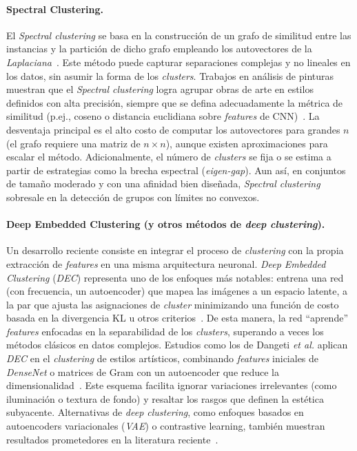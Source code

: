 \paragraph{Spectral Clustering.}
El \textit{Spectral clustering} se basa en la construcción de un grafo de similitud entre las instancias y la partición de dicho grafo empleando los autovectores de la \textit{Laplaciana}~\cite{guerin2018,gultepe2018}.
Este método puede capturar separaciones complejas y no lineales en los datos, sin asumir la forma de los \textit{clusters}.
Trabajos en análisis de pinturas muestran que el \textit{Spectral clustering} logra agrupar obras de arte en estilos definidos con alta precisión, siempre que se defina adecuadamente la métrica de similitud (p.ej., coseno o distancia euclidiana sobre \textit{features} de CNN)~\cite{gultepe2018}.
La desventaja principal es el alto costo de computar los autovectores para grandes $n$ (el grafo requiere una matriz de $n \times n$), aunque existen aproximaciones para escalar el método.
Adicionalmente, el número de \textit{clusters} se fija o se estima a partir de estrategias como la brecha espectral (\textit{eigen-gap}).
Aun así, en conjuntos de tamaño moderado y con una afinidad bien diseñada, \textit{Spectral clustering} sobresale en la detección de grupos con límites no convexos.

\paragraph{Deep Embedded Clustering (y otros métodos de \textit{deep clustering}).}
Un desarrollo reciente consiste en integrar el proceso de \textit{clustering} con la propia extracción de \textit{features} en una misma arquitectura neuronal.
\textit{Deep Embedded Clustering} (\textit{DEC}) representa uno de los enfoques más notables: entrena una red (con frecuencia, un autoencoder) que mapea las imágenes a un espacio latente, a la par que ajusta las asignaciones de \textit{cluster} minimizando una función de costo basada en la divergencia KL u otros criterios~\cite{dangeti2024}.
De esta manera, la red “aprende” \textit{features} enfocadas en la separabilidad de los \textit{clusters}, superando a veces los métodos clásicos en datos complejos.
Estudios como los de Dangeti \textit{et al.} aplican \textit{DEC} en el \textit{clustering} de estilos artísticos, combinando \textit{features} iniciales de \textit{DenseNet} o matrices de Gram con un autoencoder que reduce la dimensionalidad~\cite{dangeti2024}.
Este esquema facilita ignorar variaciones irrelevantes (como iluminación o textura de fondo) y resaltar los rasgos que definen la estética subyacente.
Alternativas de \textit{deep clustering}, como enfoques basados en autoencoders variacionales (\textit{VAE}) o contrastive learning, también muestran resultados prometedores en la literatura reciente~\cite{parisotto2022}.

